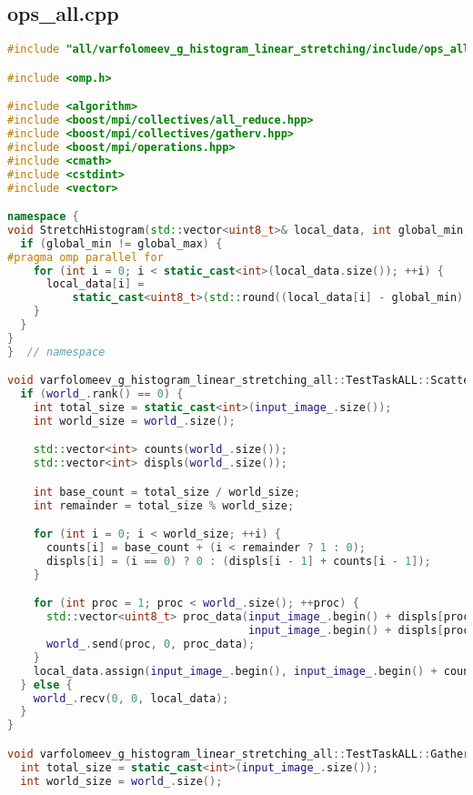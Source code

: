 \documentclass[a4paper,12pt]{article}
\begin{document}
\subsection{ops\_all.cpp}
\begin{lstlisting}[language=C++,
    breaklines=true,       % Автоматический перенос строк
    basicstyle=\small\ttfamily, % Уменьшенный шрифт
    columns=fullflexible ]
#include "all/varfolomeev_g_histogram_linear_stretching/include/ops_all.hpp"

#include <omp.h>

#include <algorithm>
#include <boost/mpi/collectives/all_reduce.hpp>
#include <boost/mpi/collectives/gatherv.hpp>
#include <boost/mpi/operations.hpp>
#include <cmath>
#include <cstdint>
#include <vector>

namespace {
void StretchHistogram(std::vector<uint8_t>& local_data, int global_min, int global_max) {
  if (global_min != global_max) {
#pragma omp parallel for
    for (int i = 0; i < static_cast<int>(local_data.size()); ++i) {
      local_data[i] =
          static_cast<uint8_t>(std::round((local_data[i] - global_min) * 255.0 / (global_max - global_min)));
    }
  }
}
}  // namespace

void varfolomeev_g_histogram_linear_stretching_all::TestTaskALL::ScatterData(std::vector<uint8_t>& local_data) {
  if (world_.rank() == 0) {
    int total_size = static_cast<int>(input_image_.size());
    int world_size = world_.size();

    std::vector<int> counts(world_.size());
    std::vector<int> displs(world_.size());

    int base_count = total_size / world_size;
    int remainder = total_size % world_size;

    for (int i = 0; i < world_size; ++i) {
      counts[i] = base_count + (i < remainder ? 1 : 0);
      displs[i] = (i == 0) ? 0 : (displs[i - 1] + counts[i - 1]);
    }

    for (int proc = 1; proc < world_.size(); ++proc) {
      std::vector<uint8_t> proc_data(input_image_.begin() + displs[proc],
                                     input_image_.begin() + displs[proc] + counts[proc]);
      world_.send(proc, 0, proc_data);
    }
    local_data.assign(input_image_.begin(), input_image_.begin() + counts[0]);
  } else {
    world_.recv(0, 0, local_data);
  }
}

void varfolomeev_g_histogram_linear_stretching_all::TestTaskALL::GatherResults(const std::vector<uint8_t>& local_data) {
  int total_size = static_cast<int>(input_image_.size());
  int world_size = world_.size();


\end{lstlisting}
\end{document}
